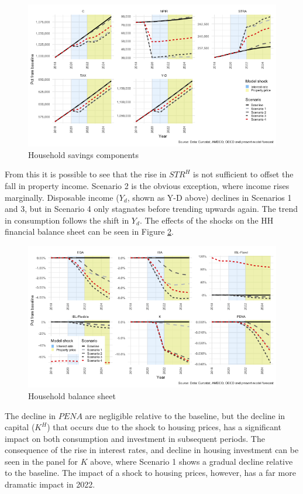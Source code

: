 \documentclass[
]{book}
\begin{document}
\begin{figure}[H]
\includegraphics[width=0.95\linewidth]{figures/fl-fi-sfc-plot-hh-indicators-npir-1} \caption{Household savings components}\label{fig:fl-fi-sfc-plot-hh-indicators-npir}
\end{figure}

From this it is possible to see that the rise in \(STR^H\) is not sufficient to offset the fall in property income. Scenario 2 is the obvious exception, where income rises marginally. Disposable income (\(Y_d\), shown as Y-D above) declines in Scenarios 1 and 3, but in Scenario 4 only stagnates before trending upwards again. The trend in consumption follows the shift in \(Y_d\). The effects of the shocks on the HH financial balance sheet can be seen in Figure \ref{fig:fl-fi-sfc-plot-hh-bs}.

\begin{figure}[H]
\includegraphics[width=0.95\linewidth]{figures/fl-fi-sfc-plot-hh-bs-1} \caption{Household balance sheet}\label{fig:fl-fi-sfc-plot-hh-bs}
\end{figure}

The decline in \(PENA\) are negligible relative to the baseline, but the decline in capital (\(K^H\)) that occurs due to the shock to housing prices, has a significant impact on both consumption and investment in subsequent periods. The consequence of the rise in interest rates, and decline in housing investment can be seen in the panel for \(K\) above, where Scenario 1 shows a gradual decline relative to the baseline. The impact of a shock to housing prices, however, has a far more dramatic impact in 2022.
\end{document}
